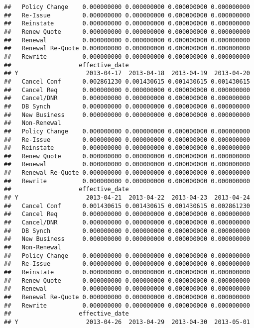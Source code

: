 \documentclass[]{article}
\begin{document}
\begin{verbatim}
##   Policy Change    0.000000000 0.000000000 0.000000000 0.000000000
##   Re-Issue         0.000000000 0.000000000 0.000000000 0.000000000
##   Reinstate        0.000000000 0.000000000 0.000000000 0.000000000
##   Renew Quote      0.000000000 0.000000000 0.000000000 0.000000000
##   Renewal          0.000000000 0.000000000 0.000000000 0.000000000
##   Renewal Re-Quote 0.000000000 0.000000000 0.000000000 0.000000000
##   Rewrite          0.000000000 0.000000000 0.000000000 0.000000000
##                   effective_date
## Y                   2013-04-17  2013-04-18  2013-04-19  2013-04-20
##   Cancel Conf      0.002861230 0.001430615 0.001430615 0.001430615
##   Cancel Req       0.000000000 0.000000000 0.000000000 0.000000000
##   Cancel/DNR       0.000000000 0.000000000 0.000000000 0.000000000
##   DB Synch         0.000000000 0.000000000 0.000000000 0.000000000
##   New Business     0.000000000 0.000000000 0.000000000 0.000000000
##   Non-Renewal                                                     
##   Policy Change    0.000000000 0.000000000 0.000000000 0.000000000
##   Re-Issue         0.000000000 0.000000000 0.000000000 0.000000000
##   Reinstate        0.000000000 0.000000000 0.000000000 0.000000000
##   Renew Quote      0.000000000 0.000000000 0.000000000 0.000000000
##   Renewal          0.000000000 0.000000000 0.000000000 0.000000000
##   Renewal Re-Quote 0.000000000 0.000000000 0.000000000 0.000000000
##   Rewrite          0.000000000 0.000000000 0.000000000 0.000000000
##                   effective_date
## Y                   2013-04-21  2013-04-22  2013-04-23  2013-04-24
##   Cancel Conf      0.001430615 0.001430615 0.001430615 0.002861230
##   Cancel Req       0.000000000 0.000000000 0.000000000 0.000000000
##   Cancel/DNR       0.000000000 0.000000000 0.000000000 0.000000000
##   DB Synch         0.000000000 0.000000000 0.000000000 0.000000000
##   New Business     0.000000000 0.000000000 0.000000000 0.000000000
##   Non-Renewal                                                     
##   Policy Change    0.000000000 0.000000000 0.000000000 0.000000000
##   Re-Issue         0.000000000 0.000000000 0.000000000 0.000000000
##   Reinstate        0.000000000 0.000000000 0.000000000 0.000000000
##   Renew Quote      0.000000000 0.000000000 0.000000000 0.000000000
##   Renewal          0.000000000 0.000000000 0.000000000 0.000000000
##   Renewal Re-Quote 0.000000000 0.000000000 0.000000000 0.000000000
##   Rewrite          0.000000000 0.000000000 0.000000000 0.000000000
##                   effective_date
## Y                   2013-04-26  2013-04-29  2013-04-30  2013-05-01

\end{verbatim}
\end{document}
